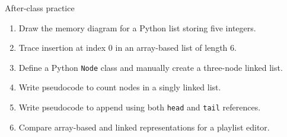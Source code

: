 \documentclass[aspectratio=169]{beamer}
\begin{document}
\begin{frame}{After-class practice}
\small
\begin{enumerate}
  \item Draw the memory diagram for a Python list storing five integers.
  \item Trace insertion at index $0$ in an array-based list of length $6$.
  \item Define a Python \texttt{Node} class and manually create a three-node linked list.
  \item Write pseudocode to count nodes in a singly linked list.
  \item Write pseudocode to append using both \texttt{head} and \texttt{tail} references.
  \item Compare array-based and linked representations for a playlist editor.
\end{enumerate}
\end{frame}
\end{document}
